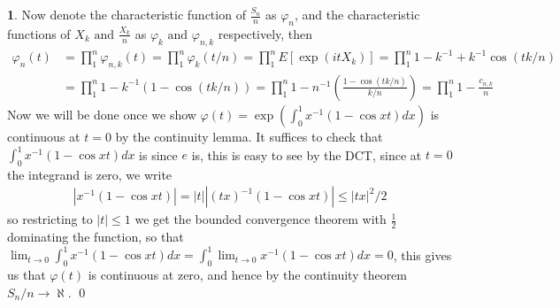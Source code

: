 \documentclass{article}
\theoremstyle{definition}
\newtheorem{pb}{}
\newcommand{\abs}[1]{\left\vert#1\right\vert}
\newcommand{\tand}{\text{ and }}
\begin{document}
\begin{pb}
        Now denote the characteristic function of \(\frac{S_n}{n}\) as \(\varphi_n\), and the characteristic functions of \(X_k \tand \frac{X_k}{n}\) as \(\varphi_k \tand \varphi_{n,k}\) respectively, then
        \begin{align*}
            \varphi_n(t) &= \prod_1^n \varphi_{n,k}(t) = \prod_1^n \varphi_k(t/n) = \prod_1^n E[\exp(itX_k)] = \prod_1^n 1 - k^{-1} + k^{-1}\cos(tk/n) \\
            &= \prod_1^n 1 - k^{-1}\left(1-\cos(tk/n)\right) = \prod_1^n 1-n^{-1}\left(\frac{1-\cos(tk/n)}{k/n}\right) = \prod_1^n 1 - \frac{c_{n,k}}{n}
        \end{align*}
        Now we will be done once we show \(\varphi(t) = \exp\left(\int_0^1 x^{-1}(1-\cos xt)dx\right)\) is continuous at \(t=0\) by the continuity lemma. It suffices to check that \(\int_0^1 x^{-1}(1-\cos xt)dx\) is since \(e\) is, this is easy to see by the DCT, since at \(t = 0\) the integrand is zero, we write
        \begin{align*}
            \abs{x^{-1}(1-\cos xt)} = \abs{t} \abs{(tx)^{-1}(1-\cos xt)} \leq \abs{tx}^2/2
        \end{align*}
        so restricting to \(\abs{t} \leq 1\) we get the bounded convergence theorem with \(\frac12\) dominating the function, so that \(\lim_{t\to0}\int_0^1 x^{-1}(1-\cos xt)dx = \int_0^1\lim_{t\to0}x^{-1}(1-\cos xt)dx = 0\), this gives us that \(\varphi(t)\) is continuous at zero, and hence by the continuity theorem \(S_n/n \to \aleph\). \qed
    \end{pb}
\end{document}

